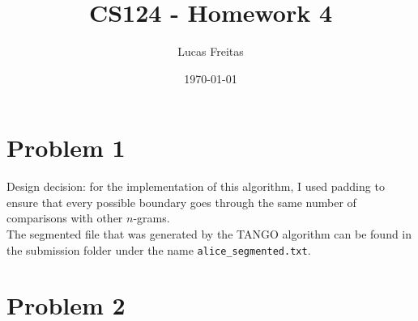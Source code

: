 \documentclass[112pt]{article}
\title{CS124 - Homework 4}
\author{Lucas Freitas}
\date{\today}
\begin{document}
\maketitle

\section*{Problem 1}

Design decision: for the implementation of this algorithm, I used padding to ensure that every possible boundary goes through the same number of comparisons with other $n$-grams.\\

The segmented file that was generated by the TANGO algorithm can be found in the submission folder under the name \texttt{alice\_segmented.txt}.

\section*{Problem 2}
\end{document}
